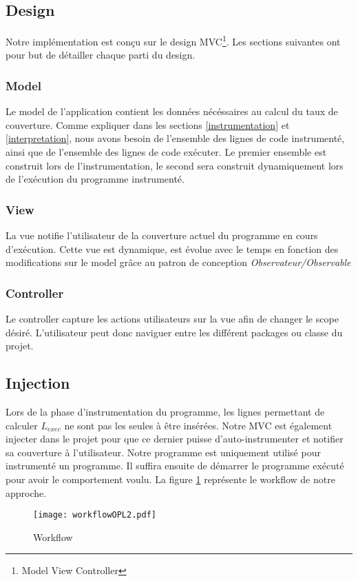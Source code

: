 \subsection{Design}

Notre implémentation est conçu sur le design MVC\footnote{Model View Controller}. Les sections suivantes ont pour but de détailler chaque parti du design.

\subsubsection{Model}

Le model de l'application contient les données nécéssaires au calcul du taux de couverture. Comme expliquer dans les sections \ref{instrumentation} et \ref{interpretation}, nous avons besoin de l'ensemble des lignes de code instrumenté, ainsi que de l'ensemble des lignes de code exécuter. Le premier ensemble est construit lors de l'instrumentation, le second sera construit dynamiquement lors de l'exécution du programme instrumenté.

\subsubsection{View}

La vue notifie l'utilisateur de la couverture actuel du programme en cours d'exécution. Cette vue est dynamique, est évolue avec le temps en fonction des modifications sur le model grâce au patron de conception \textit{Observateur/Observable}

\subsubsection{Controller}

Le controller capture les actions utilisateurs sur la vue afin de changer le scope désiré. L'utilisateur peut donc naviguer entre les différent packages ou classe du projet.

\subsection{Injection}

Lors de la phase d'instrumentation du programme, les lignes permettant de calculer $L_{exec}$ ne sont pas les seules à être insérées. Notre MVC est également injecter dans le projet pour que ce dernier puisse d'auto-instrumenter et notifier sa couverture à l'utilisateur. Notre programme est uniquement utilisé pour instrumenté un programme. Il suffira ensuite de démarrer le programme exécuté pour avoir le comportement voulu. La figure \ref{workflow} représente le workflow de notre approche. 

\begin{figure}[h]
\centering
\texttt{[image: workflowOPL2.pdf]}

\caption{Workflow}
\label{workflow}
\end{figure}


